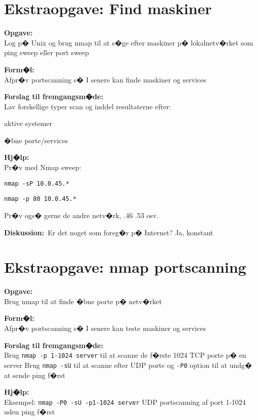 \documentclass[a4paper,11pt,notitlepage]{oevelser}
\begin{document}
\chapter{Ekstraopgave: Find maskiner}
\label{ex:nmap-sweep}

{\bfseries Opgave:}\\
Log p� Unix og brug nmap til at s�ge efter maskiner p� lokalnetv�rket som ping sweep eller port sweep

{\bfseries Form�l:}\\
Afpr�v portscanning s� I senere kan finde maskiner og services

{\bfseries Forslag til fremgangsm�de:}\\
Lav forskellige typer scan og
inddel resultaterne efter:
\begin{list2}
\item aktive systemer
\item �bne porte/services
\end{list2}

{\bfseries Hj�lp:} \\
Pr�v med Nmap sweep:
\begin{list1}
\item \verb+nmap -sP 10.0.45.*+
\item \verb+nmap -p 80 10.0.45.*+
\item Pr�v ogs� gerne de andre netv�rk, .46 .53 osv.
\end{list1}

{\bfseries Diskussion:}\
Er det noget som foreg�r p� Internet? Ja, konstant


\chapter{Ekstraopgave: nmap portscanning}
\label{ex:nmap-portscan}

{\bfseries Opgave:} \\
Brug nmap til at finde �bne porte p� netv�rket

{\bfseries Form�l:}\\
Afpr�v portscanning s� I senere kan teste maskiner og services

{\bfseries Forslag til fremgangsm�de:}\\
Brug \verb+nmap -p 1-1024 server+ til at scanne de f�rste 1024 TCP
porte p� en server
Brug \verb+nmap -sU+ til at scanne efter UDP porte og \verb+-P0+
option til at undg� at sende ping f�rst

{\bfseries Hj�lp:} \\
Eksempel: \verb+nmap -P0 -sU -p1-1024 server+ UDP portscanning af port
1-1024 uden ping f�rst
\end{document}
